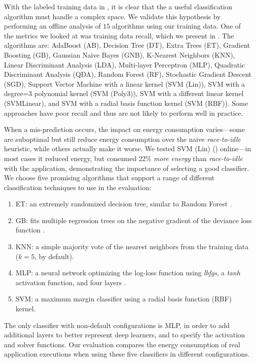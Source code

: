 With the labeled training data in , it is clear that the a useful classification algorithm must handle a complex space.
We validate this hypothesis by performing an offline analysis of $15$ algorithms using our training data.
One of the metrics we looked at was training data recall, which we present in .
The algorithms are: AdaBoost (AB), Decision Tree (DT), Extra Trees (ET), Gradient Boosting (GB), Gaussian Naive Bayes (GNB), K-Nearest Neighbors (KNN), Linear Discriminant Analysis (LDA), Multi-layer Perceptron (MLP), Quadratic Discriminant Analysis (QDA), Random Forest (RF), Stochastic Gradient Descent (SGD), Support Vector Machine with a linear kernel (SVM (Lin)), SVM with a degree=3 polynomial kernel (SVM (Poly3)), SVM with a different linear kernel (SVMLinear), and SVM with a radial basis function kernel (SVM (RBF)).
Some approaches have poor recall and thus are not likely to perform well in practice.

When a mis-prediction occurs, the impact on energy consumption varies---some are suboptimal but still reduce energy consumption over the naive \emph{race-to-idle} heuristic, while others actually make it worse.
We tested SVM (Lin) () online---in most cases it reduced energy, but consumed 22\% \emph{more energy} than \emph{race-to-idle} with the  application, demonstrating the importance of selecting a good classifier.
We choose five promising algorithms that support a range of different classification techniques to use in the evaluation:
\begin{enumerate}
\item ET: an extremely randomized decision tree, similar to Random Forest \cite{Geurts2006ExtraTrees}.
\item GB: fits multiple regression trees on the negative gradient of the deviance loss function \cite{friedman2001GradientBoosting,scikit-learn}.%
\item KNN: a simple majority vote of the nearest neighbors from the training data ($k=5$, by default).
\item MLP: a neural network optimizing the log-loss function using \emph{lbfgs}, a \emph{tanh} activation function, and four layers \cite{HintonMultiLayerPerceptron}.
\item SVM: a maximum margin classifier using a radial basis function (RBF) kernel.
\end{enumerate}
The only classifier with non-default configurations is MLP, in order to add additional layers to better represent deep learners, and to specify the activation and solver functions.
Our evaluation compares the energy consumption of real application executions when using these five classifiers in different configurations.
